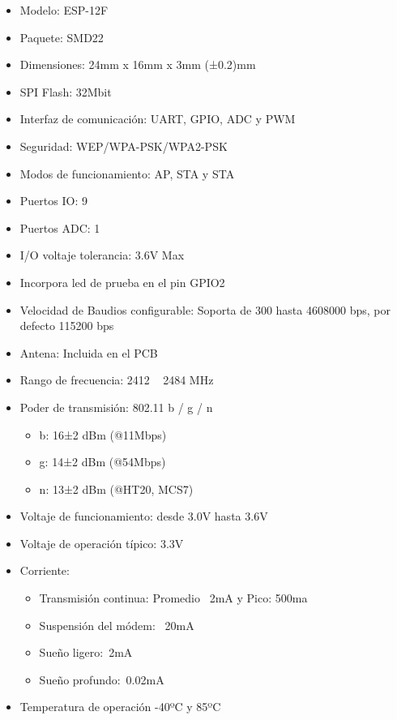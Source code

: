     \begin{itemize}
        \item Modelo: ESP-12F
        \item Paquete: SMD22
        \item Dimensiones: 24mm x 16mm x 3mm (±0.2)mm
        \item SPI Flash: 32Mbit
        \item Interfaz de comunicación: UART, GPIO, ADC y PWM
        \item Seguridad: WEP/WPA-PSK/WPA2-PSK
        \item Modos de funcionamiento: AP, STA y STA
        \item Puertos IO: 9
        \item Puertos ADC: 1
        \item I/O voltaje tolerancia: 3.6V Max
        \item Incorpora led de prueba en el pin GPIO2
        \item Velocidad de Baudios configurable: Soporta de 300 hasta 4608000 bps, por defecto 115200 bps
        \item Antena: Incluida en el PCB
        \item Rango de frecuencia: 2412 ~ 2484 MHz
        \item Poder de transmisión: 802.11 b / g / n
            \begin{itemize}
                \item b: 16±2 dBm (@11Mbps)
                \item g: 14±2 dBm (@54Mbps)
                \item n: 13±2 dBm (@HT20, MCS7)
            \end{itemize}
        \item Voltaje de funcionamiento: desde 3.0V hasta 3.6V
        \item Voltaje de operación típico: 3.3V
        \item Corriente:
            \begin{itemize}
                \item Transmisión continua: Promedio ~2mA y Pico: 500ma
                \item Suspensión del módem: ~20mA
                \item Sueño ligero:~2mA
                \item Sueño profundo:~0.02mA
            \end{itemize}
        \item Temperatura de operación -40ºC y 85ºC
    \end{itemize}

